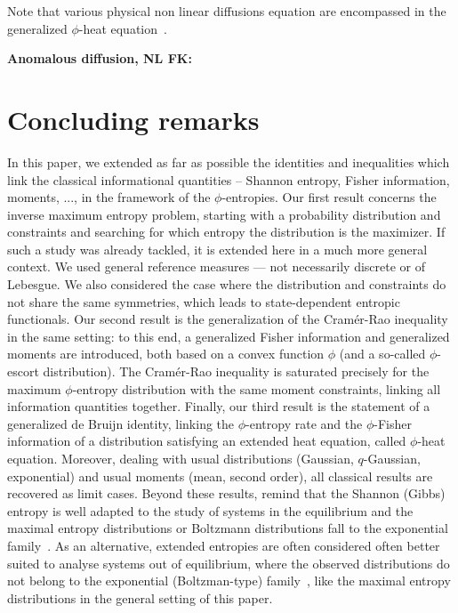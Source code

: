 \documentclass[entropy,article,submit,moreauthors,pdftex]{Definitions/mdpi}
\newcommand{\SZ}[1]{{\color{blue} #1}}
\newcommand{\Avoir}[1]{{\color{red}\bf #1}}
\begin{document}
Note that various physical non linear diffusions equation are encompassed in the
generalized $\phi$-heat equation~\cite{GilKer04, Vaz06}.

\Avoir{Anomalous diffusion, NL FK: \cite{TsaLen02,}}




\section{Concluding remarks}
\label{sec:Conclusion}

In this  paper, we extended as  far as possible the  identities and inequalities
which link  the classical  informational quantities  -- Shannon  entropy, Fisher
information, moments, ...,  in the framework of the  $\phi$-entropies. Our first
result concerns the inverse maximum entropy problem, starting with a probability
distribution and constraints and searching for which entropy the distribution is
the maximizer.  If  such a study was  already tackled, it is extended  here in a
much  more  general  context.   We  used  general  reference  measures  ---  not
necessarily discrete  or of  Lebesgue.  We  also considered  the case  where the
distribution and  constraints do not share  the same symmetries, which  leads to
state-dependent entropic  functionals.  Our second result  is the generalization
of the Cram\'er-Rao  inequality in the same setting: to  this end, a generalized
Fisher  information and  generalized moments  are  introduced, both  based on  a
convex  function  $\phi$  (and  a so-called  $\phi$-escort  distribution).   The
Cram\'er-Rao inequality  is saturated  precisely for the  maximum $\phi$-entropy
distribution  with   the  same  moment  constraints,   linking  all  information
quantities  together.   Finally,  our  third   result  is  the  statement  of  a
generalized  de  Bruijn  identity,  linking  the  $\phi$-entropy  rate  and  the
$\phi$-Fisher  information  of  a   distribution  satisfying  an  extended  heat
equation,   called  $\phi$-heat   equation.    Moreover,   dealing  with   usual
distributions  (Gaussian, $q$-Gaussian,  exponential) and  usual moments  (mean,
second order),  all classical results  are recovered as limit  cases. \SZ{Beyond
  these results, remind that the Shannon  (Gibbs) entropy is well adapted to the
  study of systems  in the equilibrium and the maximal  entropy distributions or
  Boltzmann  distributions   fall  to  the   exponential  family~\cite{CovTho06,
    BorLew91:05, Arn01,  MezMon09}.  As  an alternative, extended  entropies are
  often considered  often better suited  to analyse systems out  of equilibrium,
  where  the   observed  distributions   do  not   belong  to   the  exponential
  (Boltzman-type)   family~\cite{Tsa88,   TsaMen98,  Tsa99,   Tsa09,   EssSch00,
    ParBir05}, like the maximal entropy  distributions in the general setting of
  this paper.}
\end{document}

